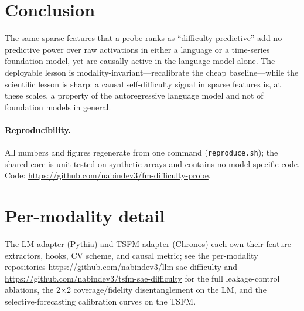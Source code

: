 \documentclass[11pt]{article}
\begin{document}
\section{Conclusion}
The same sparse features that a probe ranks as ``difficulty-predictive'' add no
predictive power over raw activations in either a language or a time-series
foundation model, yet are causally active in the language model alone. The
deployable lesson is modality-invariant---recalibrate the cheap baseline---while
the scientific lesson is sharp: a causal self-difficulty signal in sparse
features is, at these scales, a property of the autoregressive language model and
not of foundation models in general.

\paragraph{Reproducibility.}
All numbers and figures regenerate from one command
(\texttt{reproduce.sh}); the shared core is unit-tested on synthetic arrays and
contains no model-specific code. Code: \url{https://github.com/nabindev3/fm-difficulty-probe}.

\small



\appendix
\section{Per-modality detail}
The LM adapter (Pythia) and TSFM adapter (Chronos) each own their feature
extractors, hooks, CV scheme, and causal metric; see the per-modality
repositories \url{https://github.com/nabindev3/llm-sae-difficulty} and
\url{https://github.com/nabindev3/tsfm-sae-difficulty} for the full leakage-control
ablations, the 2$\times$2 coverage/fidelity disentanglement on the LM, and the
selective-forecasting calibration curves on the TSFM.
\end{document}
